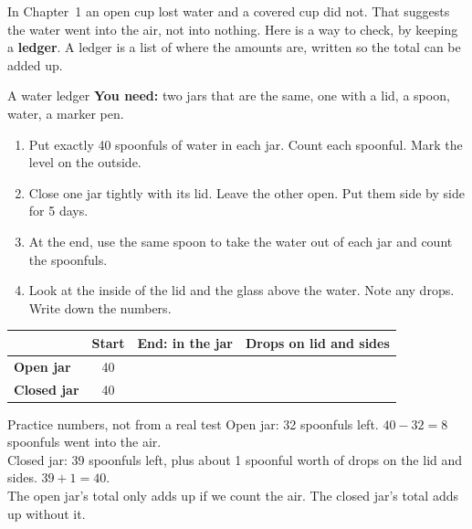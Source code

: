 \label{ch4}

In Chapter~1 an open cup lost water and a covered cup did not. That suggests the water went into the air, not into nothing. Here is a way to check, by keeping a \textbf{ledger}. A ledger is a list of where the amounts are, written so the total can be added up.

\begin{tryit}{A water ledger}
\textbf{You need:} two jars that are the same, one with a lid, a spoon, water, a marker pen.
\begin{enumerate}[leftmargin=1.6em]
\item Put exactly 40 spoonfuls of water in each jar. Count each spoonful. Mark the level on the outside.
\item Close one jar tightly with its lid. Leave the other open. Put them side by side for 5 days.
\item At the end, use the same spoon to take the water out of each jar and count the spoonfuls.
\item Look at the inside of the lid and the glass above the water. Note any drops. Write down the numbers.
\end{enumerate}
\par\medskip
\renewcommand{\arraystretch}{1.6}
\begin{tabular}{|l|c|c|c|}
\hline
 & \textbf{Start} & \textbf{End: in the jar} & \textbf{Drops on lid and sides}\\ \hline
\textbf{Open jar} & 40 & & \\ \hline
\textbf{Closed jar} & 40 & & \\ \hline
\end{tabular}
\end{tryit}

\begin{worked}{Practice numbers, not from a real test}
Open jar: 32 spoonfuls left. $40-32=8$ spoonfuls went into the air.\\
Closed jar: 39 spoonfuls left, plus about 1 spoonful worth of drops on the lid and sides. $39+1=40$.\\
The open jar's total only adds up if we count the air. The closed jar's total adds up without it.
\end{worked}

\begin{center}
\end{center}

